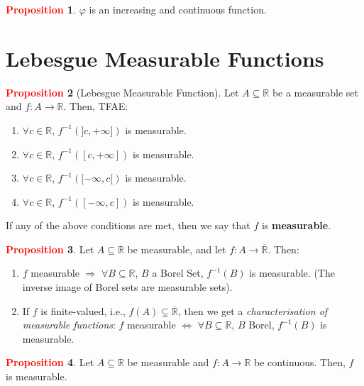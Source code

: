 \documentclass[reqno,11pt]{amsart}
\theoremstyle{definition}
\newtheorem{question}{Question}
\newcommand{\bb}[1]{\mathbb{#1}}
\theoremstyle{definition}
\newtheorem{prop}{\textcolor{red}{Proposition}}
\theoremstyle{remark}
\begin{document}
\begin{prop}
	$\varphi$ is an increasing and continuous function. 
\end{prop}

\section{Lebesgue Measurable Functions}

\begin{prop}[Lebesgue Measurable Function]
	Let $A \subseteq \bb{R}$ be a measurable set and $f: A \rightarrow \bb{R}$. Then, TFAE: 
	\begin{enumerate}[nolistsep]
		\item $\forall c \in \bb{R}$, $f^{-1} (]c, + \infty])$ is measurable. 
		\item $\forall c \in \bb{R}$, $f^{-1} ([c, + \infty])$ is measurable.
		\item $\forall c \in \bb{R}$, $f^{-1} ([-\infty, c[)$ is measurable.
		\item $\forall c \in \bb{R}$, $f^{-1} ([-\infty, c])$ is measurable.
	\end{enumerate}
	If any of the above conditions are met, then we say that $f$ is \textbf{measurable}. 
\end{prop}

\begin{prop}
	Let $A \subseteq \bb{R}$ be measurable, and let $f: A \rightarrow \overline{\bb{R}}$. Then: 
	\begin{enumerate}
		\item $f$ measurable $\Rightarrow$ $\forall B \subseteq \bb{R}$, $B$ a Borel Set, $f^{-1}(B)$ is measurable. (The inverse image of Borel sets are measurable sets).
		\item If $f$ is finite-valued, i.e., $f(A) \subsetneq \overline{\bb{R}}$, then we get a \emph{characterisation of measurable functions}: $f$ measurable $\iff$ $\forall B \subseteq \bb{R}$, $B$ Borel, $f^{-1}(B)$ is measurable. 
	\end{enumerate}
\end{prop}

\begin{prop}
	Let $A \subseteq \bb{R}$ be measurable and $f: A \rightarrow \bb{R}$ be continuous. Then, $f$ is measurable. 
\end{prop}

\end{document}
